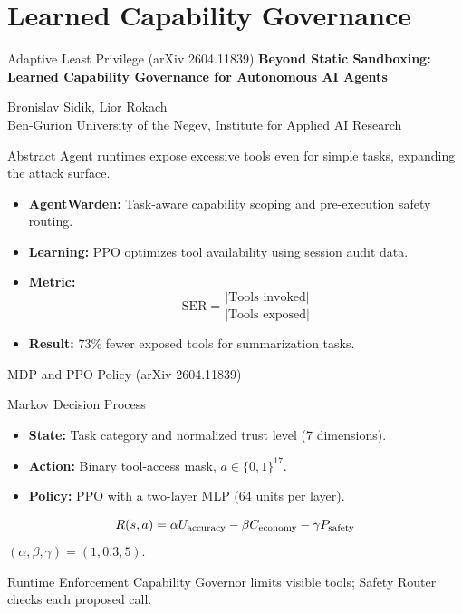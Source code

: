 \documentclass[aspectratio=169]{beamer}
\begin{document}
\section{Learned Capability Governance}
\begin{frame}{Adaptive Least Privilege (arXiv 2604.11839)}
    \footnotesize
    \textbf{Beyond Static Sandboxing: Learned Capability Governance for Autonomous AI Agents}

    {\small Bronislav Sidik, Lior Rokach\\Ben-Gurion University of the Negev, Institute for Applied AI Research}
    \begin{block}{Abstract}
        Agent runtimes expose excessive tools even for simple tasks, expanding the attack surface.
    \end{block}
    \begin{itemize}
        \item \textbf{AgentWarden:} Task-aware capability scoping and pre-execution safety routing.
        \item \textbf{Learning:} PPO optimizes tool availability using session audit data.
        \item \textbf{Metric:}
            \[\mathrm{SER}=\frac{|\text{Tools invoked}|}{|\text{Tools exposed}|}\]
        \item \textbf{Result:} 73\% fewer exposed tools for summarization tasks.
    \end{itemize}
\end{frame}

\begin{frame}{MDP and PPO Policy (arXiv 2604.11839)}
    \begin{block}{Markov Decision Process}
        \begin{itemize}
            \item \textbf{State:} Task category and normalized trust level (7 dimensions).
            \item \textbf{Action:} Binary tool-access mask, $a\in\{0,1\}^{17}$.
            \item \textbf{Policy:} PPO with a two-layer MLP (64 units per layer).
        \end{itemize}
        \[R(s,a)=\alpha U_{\rm accuracy}-\beta C_{\rm economy}-\gamma P_{\rm safety}\]
        \small $(\alpha,\beta,\gamma)=(1,0.3,5)$.
    \end{block}
    \begin{block}{Runtime Enforcement}
        Capability Governor limits visible tools; Safety Router checks each proposed call.
    \end{block}
\end{frame}
\end{document}
